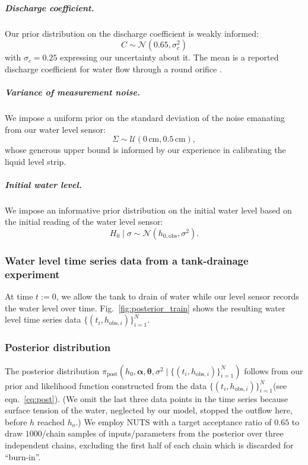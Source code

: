 \documentclass[a4paper,fleqn]{cas-dc}
\newcommand\thedata {$\{(t_i,h_{\text{obs}, i})\}_{i=1}^{N}$\xspace}
\newcommand\thedatanomath {\{(t_i,h_{\text{obs}, i})\}_{i=1}^{N}}
\begin{document}



\subparagraph{Discharge coefficient.} 
Our prior distribution on the discharge coefficient is weakly informed:
\begin{equation}
	C \sim \mathcal{N}(0.65, \sigma_c^2)
\end{equation} with $\sigma_c=0.25$ expressing our uncertainty about it. The mean is a reported discharge coefficient for water flow through a round orifice \cite{hicks2014determining}. 


\subparagraph{Variance of measurement noise.} 
We impose a uniform prior on the standard deviation of the noise emanating from our water level sensor:
\begin{equation}
\Sigma \sim \mathcal{U}(0\,\text{cm}, 0.5\,\text{cm}),
\end{equation} whose generous upper bound is informed by our experience in calibrating the liquid level strip. 


\subparagraph{Initial water level.} We impose an informative prior distribution on the initial water level based on the initial reading of the water level sensor:
\begin{equation}
	H_0 \mid \sigma \sim \mathcal{N}(h_{0, \text{obs}}, \sigma^2).
\end{equation} 


\subsubsection{Water level time series data from a tank-drainage experiment} At time $t:=0$, we allow the tank to drain of water while our level sensor records the water level over time. 
Fig.~\ref{fig:posterior_train} shows the resulting water level time series data \thedata.

\subsubsection{Posterior distribution}
The posterior distribution $\pi_{\text{post}}(h_0, \boldsymbol \alpha, \boldsymbol \theta, \sigma^2 \mid \thedatanomath)$ follows from our prior and likelihood function constructed from the data \thedata (see eqn.~\ref{eq:post}). (We omit the last three data points in the time series because surface tension of the water, neglected by our model, stopped the outflow here, before $h$ reached $h_o$.)
We employ NUTS with a target acceptance ratio of $0.65$ to draw $1000$/chain samples of inputs/parameters from the posterior over three independent chains, excluding the first half of each chain which is discarded for ``burn-in''. 
\end{document}
